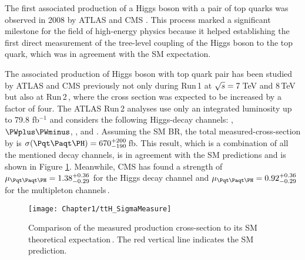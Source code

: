 The first associated production of a Higgs boson with a pair of top 
quarks was observed in 2008 by ATLAS \cite{ATLAS:2018mme} 
and CMS \cite{Skovpen:2018aoe}. 
This process marked a significant milestone for the field of high-energy 
physics because it helped establishing the first direct 
measurement of the tree-level coupling of the Higgs boson 
to the top quark, which was in agreement with the SM expectation.

The associated production of Higgs boson with top quark pair has been studied by ATLAS and CMS previously
not only during Run$\,$1 at $\sqrt{s}=7\,$TeV and $8\,$TeV \cite{ATLAS:2014ayi} \cite{CMS:2014tll} 
but also at Run$\,$2\,\cite{ATLAS:2018mme}, where the cross section was expected 
to be increased by a factor of four. The ATLAS Run$\,$2 analyses use only an integrated 
luminosity up to 79.8 fb$^{-1}$ and considers the following Higgs-decay channels: 
\bbbar, $\PWplus \PWminus$, \Ptauon\APtauon, \Pgamma\Pgamma and \PZ\PZ.
Assuming the SM BR, the total measured-cross-section by  \cite{ATLAS:2018mme} is
$\sigma(\ttH)= 670^{+200}_{-190}\,$fb. This result, which is a combination 
of all the mentioned decay channels, is in agreement with the SM predictions and
is shown in Figure \ref{fig:Chap1:ttH:SigmaMeasure}. 
Meanwhile, CMS has found a strength of $\mu_{\ttH} = 1.38^{+0.36}_{-0.29}$ for the \Pgamma\Pgamma Higgs
decay channel and $\mu_{\ttH} = 0.92^{+0.36}_{-0.29}$ for the multipleton channels\,\cite{Giraldi:2022wkt}.

\begin{figure}
    \centering
    \texttt{[image: Chapter1/ttH\_SigmaMeasure]}
    \caption{Comparison of the measured \ttH production cross-section 
    to its SM theoretical expectation\,\cite{ATLAS:2018mme}.
    The red vertical line indicates the SM prediction.}
    \label{fig:Chap1:ttH:SigmaMeasure}
\end{figure}






